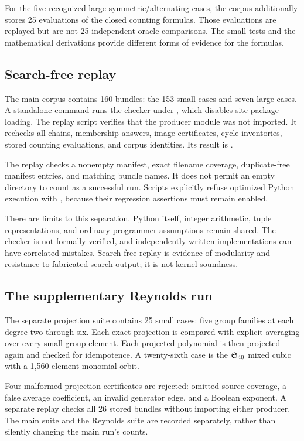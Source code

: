 For the five recognized large symmetric/alternating cases, the corpus additionally stores 25 evaluations of the closed counting formulas. Those evaluations are replayed but are not 25 independent oracle comparisons. The small tests and the mathematical derivations provide different forms of evidence for the formulas.

\subsection{Search-free replay}
The main corpus contains 160 bundles: the 153 small cases and seven large cases. A standalone command runs the checker under , which disables site-package loading. The replay script verifies that the producer module was not imported. It rechecks all chains, membership answers, image certificates, cycle inventories, stored counting evaluations, and corpus identities. Its result is .

The replay checks a nonempty manifest, exact filename coverage, duplicate-free manifest entries, and matching bundle names. It does not permit an empty directory to count as a successful run. Scripts explicitly refuse optimized Python execution with , because their regression assertions must remain enabled.

There are limits to this separation. Python itself, integer arithmetic, tuple representations, and ordinary programmer assumptions remain shared. The checker is not formally verified, and independently written implementations can have correlated mistakes. Search-free replay is evidence of modularity and resistance to fabricated search output; it is not kernel soundness.

\subsection{The supplementary Reynolds run}
The separate projection suite contains 25 small cases: five group families at each degree two through six. Each exact projection is compared with explicit averaging over every small group element. Each projected polynomial is then projected again and checked for idempotence. A twenty-sixth case is the $\mathfrak S_{40}$ mixed cubic with a 1,560-element monomial orbit.

Four malformed projection certificates are rejected: omitted source coverage, a false average coefficient, an invalid generator edge, and a Boolean exponent. A separate  replay checks all 26 stored bundles without importing either producer. The main suite and the Reynolds suite are recorded separately, rather than silently changing the main run's counts.

